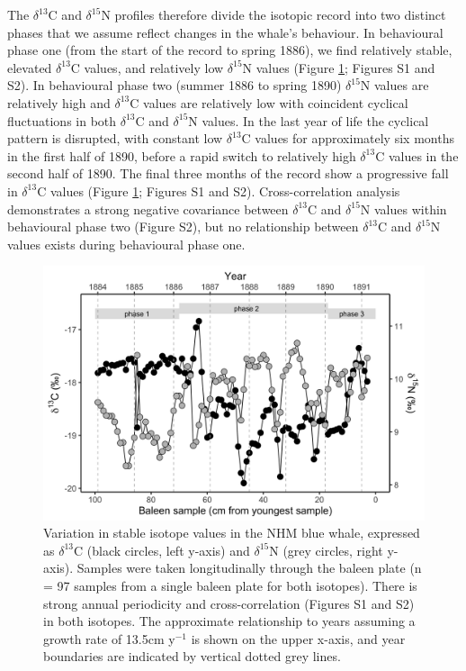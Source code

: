 \documentclass[a4paper,12pt]{article}
\begin{document}
The \(\delta^{13}\)C and \(\delta^{15}\)N profiles therefore divide the isotopic record into two distinct phases that we assume reflect changes in the whale’s behaviour. 
In behavioural phase one (from the start of the record to spring 1886), we find relatively stable, elevated \(\delta^{13}\)C values, and relatively low \(\delta^{15}\)N values (Figure \ref{fig1}; Figures S1 and S2). 
In behavioural phase two (summer 1886 to spring 1890) \(\delta^{15}\)N values are relatively high and \(\delta^{13}\)C values are relatively low with coincident cyclical fluctuations in both \(\delta^{13}\)C and \(\delta^{15}\)N values.
In the last year of life the cyclical pattern is disrupted, with constant low \(\delta^{13}\)C values for approximately six months in the first half of 1890, before a rapid switch to relatively high \(\delta^{13}\)C values in the second half of 1890. 
The final three months of the record show a progressive fall in \(\delta^{13}\)C values (Figure \ref{fig1}; Figures S1 and S2). 
Cross-correlation analysis demonstrates a strong negative covariance between \(\delta^{13}\)C and \(\delta^{15}\)N values within behavioural phase two (Figure S2), but no relationship between \(\delta^{13}\)C and \(\delta^{15}\)N values exists during behavioural phase one.

\begin{figure}
  \centering
  \includegraphics[width = \linewidth]{figures/Figure-1-raw-dC-dN-data.png}
  \caption{Variation in stable isotope values in the NHM blue whale, expressed as $\delta^{13}$C (black circles, left y-axis) and $\delta^{15}$N (grey circles, right y-axis). Samples were taken longitudinally through the baleen plate (n = 97 samples from a single baleen plate for both isotopes). There is strong annual periodicity and cross-correlation (Figures S1 and S2) in both isotopes. The approximate relationship to years assuming a growth rate of 13.5cm y$^{-1}$ is shown on the upper x-axis, and year boundaries are indicated by vertical dotted grey lines.}
  \label{fig1}
\end{figure}
\end{document}
